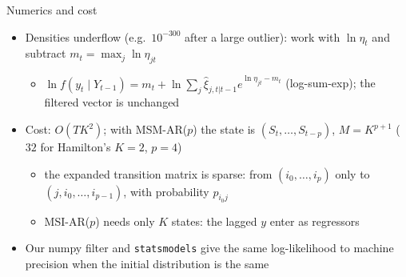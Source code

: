 \begin{frame}{Numerics and cost}
\itemsize{\small}
\begin{itemize}
    \item Densities underflow (e.g.\ $10^{-300}$ after a large outlier): work with $\ln\eta_t$ and subtract $m_t = \max_j \ln\eta_{jt}$
    \begin{itemize}
        \item $\ln f(y_t \mid Y_{t-1}) = m_t + \ln\sum_j \hat\xi_{j,t|t-1}e^{\ln\eta_{jt} - m_t}$ (log-sum-exp); the filtered vector is unchanged
    \end{itemize}
    \item Cost: $O(TK^2)$; with MSM-AR($p$) the state is $(S_t, \dots, S_{t-p})$, $M = K^{p+1}$ ($32$ for Hamilton's $K = 2$, $p = 4$)
    \begin{itemize}
        \item the expanded transition matrix is sparse: from $(i_0, \dots, i_p)$ only to $(j, i_0, \dots, i_{p-1})$, with probability $p_{i_0 j}$
        \item MSI-AR($p$) needs only $K$ states: the lagged $y$ enter as regressors
    \end{itemize}
    \item Our numpy filter and \texttt{statsmodels} give the same log-likelihood to machine precision when the initial distribution is the same
\end{itemize}
\end{frame}

